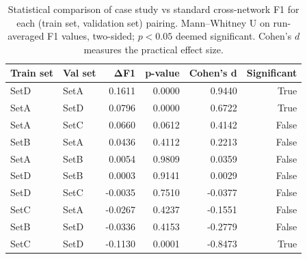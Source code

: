 \begin{table}
\caption{Statistical comparison of case study vs standard cross-network F1 for each (train set, validation set) pairing. Mann--Whitney U on run-averaged F1 values, two-sided; $p<0.05$ deemed significant. Cohen's $d$ measures the practical effect size.}
\label{tab:q6_stats}
\begin{tabular}{llrrrr}
\toprule
Train set & Val set & ΔF1 & p-value & Cohen's d & Significant \\
\midrule
SetD & SetA & 0.1611 & 0.0000 & 0.9440 & True \\
SetA & SetD & 0.0796 & 0.0000 & 0.6722 & True \\
SetA & SetC & 0.0660 & 0.0612 & 0.4142 & False \\
SetB & SetA & 0.0436 & 0.4112 & 0.2213 & False \\
SetA & SetB & 0.0054 & 0.9809 & 0.0359 & False \\
SetD & SetB & 0.0003 & 0.9141 & 0.0029 & False \\
SetD & SetC & -0.0035 & 0.7510 & -0.0377 & False \\
SetC & SetA & -0.0267 & 0.4237 & -0.1551 & False \\
SetB & SetD & -0.0336 & 0.4153 & -0.2779 & False \\
SetC & SetD & -0.1130 & 0.0001 & -0.8473 & True \\
\bottomrule
\end{tabular}
\end{table}
